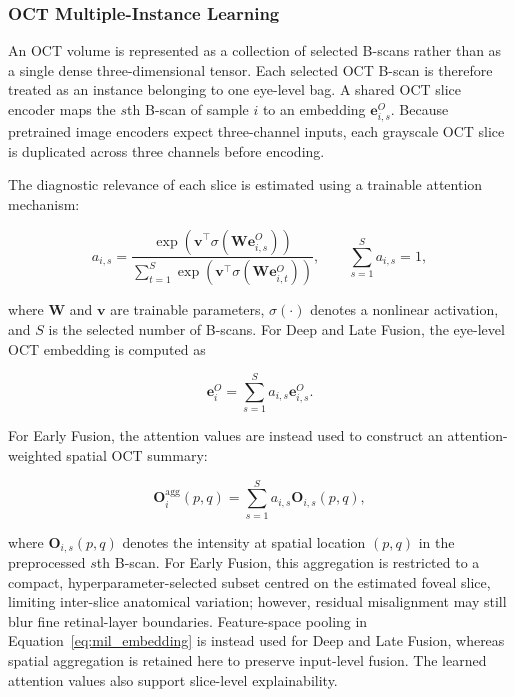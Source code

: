 \documentclass[sn-mathphys]{sn-jnl}%
\theoremstyle{thmstyleone}%
\theoremstyle{thmstyletwo}%
\theoremstyle{thmstylethree}%
\begin{document}
\subsubsection{OCT Multiple-Instance Learning}
\label{subsubsec:oct_mil}

An OCT volume is represented as a collection of selected B-scans rather than as a single dense three-dimensional tensor. Each selected OCT B-scan is therefore treated as an instance belonging to one eye-level bag. A shared OCT slice encoder maps the $s$th B-scan of sample $i$ to an embedding $\mathbf{e}_{i,s}^{O}$. Because pretrained image encoders expect three-channel inputs, each grayscale OCT slice is duplicated across three channels before encoding.

The diagnostic relevance of each slice is estimated using a trainable attention mechanism:

\begin{equation}
    a_{i,s} =
    \frac{
        \exp\!\left(
        \mathbf{v}^{\top}
        \sigma\!\left(\mathbf{W}\mathbf{e}_{i,s}^{O}\right)
        \right)
    }{
        \sum_{t=1}^{S}
        \exp\!\left(
        \mathbf{v}^{\top}
        \sigma\!\left(\mathbf{W}\mathbf{e}_{i,t}^{O}\right)
        \right)
    },
    \qquad
    \sum_{s=1}^{S}a_{i,s}=1,
    \label{eq:mil_attention}
\end{equation}

where $\mathbf{W}$ and $\mathbf{v}$ are trainable parameters, $\sigma(\cdot)$ denotes a nonlinear activation, and $S$ is the selected number of B-scans. For Deep and Late Fusion, the eye-level OCT embedding is computed as

\begin{equation}
    \mathbf{e}_{i}^{O}
    =
    \sum_{s=1}^{S}
    a_{i,s}\mathbf{e}_{i,s}^{O}.
    \label{eq:mil_embedding}
\end{equation}

For Early Fusion, the attention values are instead used to construct an attention-weighted spatial OCT summary:

\begin{equation}
    \mathbf{O}_{i}^{\mathrm{agg}}(p,q)
    =
    \sum_{s=1}^{S}
    a_{i,s}\mathbf{O}_{i,s}(p,q),
    \label{eq:mil_spatial}
\end{equation}

where $\mathbf{O}_{i,s}(p,q)$ denotes the intensity at spatial location $(p,q)$ in the preprocessed $s$th B-scan. For Early Fusion, this aggregation is restricted to a compact, hyperparameter-selected subset centred on the estimated foveal slice, limiting inter-slice anatomical variation; however, residual misalignment may still blur fine retinal-layer boundaries. Feature-space pooling in Equation~\eqref{eq:mil_embedding} is instead used for Deep and Late Fusion, whereas spatial aggregation is retained here to preserve input-level fusion. The learned attention values also support slice-level explainability.
\end{document}
